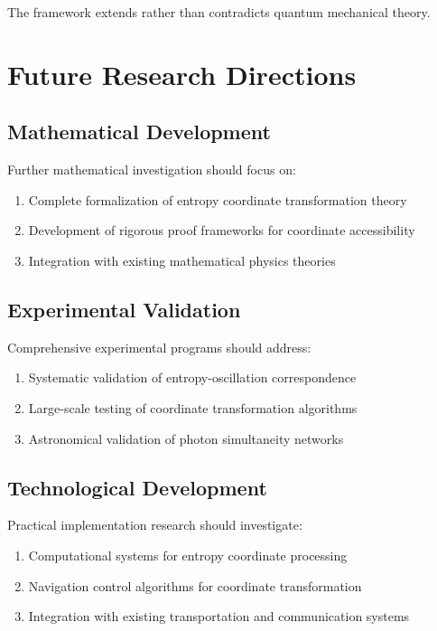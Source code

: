 \documentclass[12pt,a4paper]{article}
\begin{document}
The framework extends rather than contradicts quantum mechanical theory.

\section{Future Research Directions}

\subsection{Mathematical Development}

Further mathematical investigation should focus on:

\begin{enumerate}
\item Complete formalization of entropy coordinate transformation theory
\item Development of rigorous proof frameworks for coordinate accessibility
\item Integration with existing mathematical physics theories
\end{enumerate}

\subsection{Experimental Validation}

Comprehensive experimental programs should address:

\begin{enumerate}
\item Systematic validation of entropy-oscillation correspondence  
\item Large-scale testing of coordinate transformation algorithms
\item Astronomical validation of photon simultaneity networks
\end{enumerate}

\subsection{Technological Development}

Practical implementation research should investigate:

\begin{enumerate}
\item Computational systems for entropy coordinate processing
\item Navigation control algorithms for coordinate transformation
\item Integration with existing transportation and communication systems
\end{enumerate}
\end{document}
